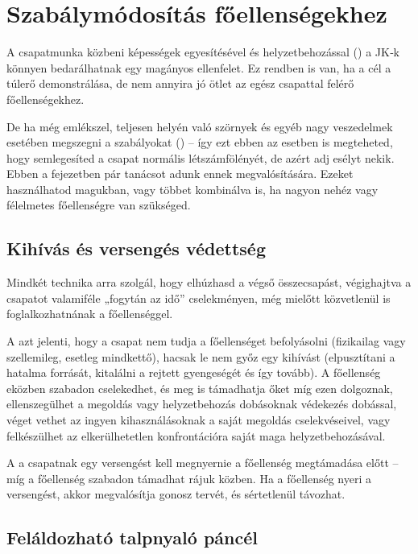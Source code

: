 \section{Szabálymódosítás főellenségekhez}

A csapatmunka közbeni képességek egyesítésével és helyzetbehozással () a JK‑k könnyen bedarálhatnak egy magányos ellenfelet. Ez rendben is van, ha a cél a túlerő demonstrálása, de nem annyira jó ötlet az egész csapattal felérő főellenségekhez.

De ha még emlékszel, teljesen helyén való szörnyek és egyéb nagy veszedelmek esetében megszegni a szabályokat () – így ezt ebben az esetben is megteheted, hogy semlegesíted a csapat normális létszámfölényét, de azért adj esélyt nekik. Ebben a fejezetben pár tanácsot adunk ennek megvalósítására. Ezeket használhatod magukban, vagy többet kombinálva is, ha nagyon nehéz vagy félelmetes főellenségre van szükséged.

\subsection{Kihívás és versengés védettség}

Mindkét technika arra szolgál, hogy elhúzhasd a végső összecsapást, végighajtva a csapatot valamiféle „fogytán az idő” cselekményen, még mielőtt közvetlenül is foglalkozhatnának a főellenséggel.

A  azt jelenti, hogy a csapat nem tudja a főellenséget befolyásolni (fizikailag vagy szellemileg, esetleg mindkettő), hacsak le nem győz egy kihívást (elpusztítani a hatalma forrását, kitalálni a rejtett gyengeségét és így tovább). A főellenség eközben szabadon cselekedhet, és meg is támadhatja őket míg ezen dolgoznak, ellenszegülhet a megoldás vagy helyzetbehozás dobásoknak védekezés dobással, véget vethet az ingyen kihasználásoknak a saját megoldás cselekvéseivel, vagy felkészülhet az elkerülhetetlen konfrontációra saját maga helyzetbehozásával.

A  a csapatnak egy versengést kell megnyernie a főellenség megtámadása előtt – míg a főellenség szabadon támadhat rájuk közben. Ha a főellenség nyeri a versengést, akkor megvalósítja gonosz tervét, és sértetlenül távozhat.

\subsection{Feláldozható talpnyaló páncél}

